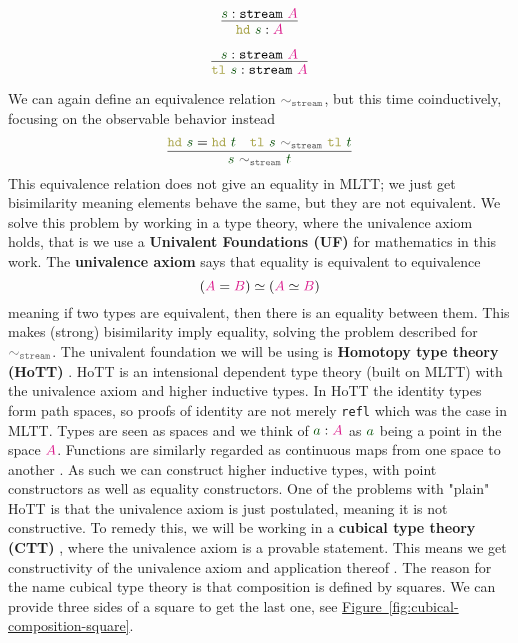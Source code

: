 \documentclass[twoside,11pt,openright]{report}
\theoremstyle{plain} %
\theoremstyle{definition}
\theoremstyle{remark}
\newcommand*{\figref}[1]{\hyperref[fig:#1]{Figure~\ref*{fig:#1}}}
\newcommand*{\term}[1]{\textcolor{green!30!black}{#1}} %
\newcommand*{\type}[1]{\textcolor{magenta!90!black}{#1}}
\newcommand*{\relation}[1]{\textcolor{gray!75!black}{\ensuremath{\mathtt{#1}}}}
\newcommand*{\destructor}[1]{\textcolor{yellow!60!black}{\ensuremath{\mathtt{#1}}}}
\newcommand*{\typeformer}[1]{\ensuremath{\mathtt{#1}}}
\begin{document}
\begin{center}
  \strut
  \hfill
  \begin{minipage}{0.225\linewidth}
    \begin{equation}
      \vcenter{\infer{\destructor{hd}~\term{s} : \type{A}}{\term{s} : \typeformer{stream}~\type{A}}}
    \end{equation}
  \end{minipage}
  \hfill
  \begin{minipage}{0.25\linewidth}
    \begin{equation}
      \vcenter{\infer{\destructor{tl}~\term{s}: \typeformer{stream}~\type{A}}{\term{s} : \typeformer{stream}~\type{A}}}
    \end{equation}
  \end{minipage}
  \hfill
  \strut
\end{center}
We can again define an equivalence relation \(\relation{\sim_{stream}}\), but this time coinductively, focusing on the observable behavior instead
\begin{equation}
  \label{eq:stream-bisimilarity}
  \vcenter{\infer{\term{s}~\relation{\sim_{stream}}~\term{t}}{\destructor{hd}~\term{s} = \destructor{hd}~\term{t} & \destructor{tl}~\term{s}~\relation{\sim_{stream}}~\destructor{tl}~\term{t}}}
\end{equation}
This equivalence relation does not give an equality in MLTT; we just get bisimilarity meaning elements behave the same, but they are not equivalent. We solve this problem by working in a type theory, where the univalence axiom holds, that is we use a \textbf{Univalent Foundations (UF)} for mathematics in this work. The \textbf{univalence axiom} says that equality is equivalent to equivalence
\begin{equation}
  (\type{A} = \type{B}) \simeq (\type{A} \simeq \type{B})
\end{equation}
meaning if two types are equivalent, then there is an equality between them. This makes (strong) bisimilarity imply equality, solving the problem described for \(\relation{\sim_{stream}}\). The univalent foundation we will be using is \textbf{Homotopy type theory (HoTT)} \cite{hottbook}. HoTT is an intensional dependent type theory (built on MLTT) with the univalence axiom and higher inductive types. In HoTT the identity types form path spaces, so proofs of identity are not merely \texttt{refl} which was the case in MLTT. Types are seen as spaces and we think of \(\term{a} : \type{A}\) as \(\term{a}\) being a point in the space \(\type{A}\). Functions are similarly regarded as continuous maps from one space to another \cite{nlab:homotopy_type_theory}. As such we can construct higher inductive types, with point constructors as well as equality constructors. One of the problems with "plain" HoTT is that the univalence axiom is just postulated, meaning it is not constructive. To remedy this, we will be working in a \textbf{cubical type theory (CTT)} \cite{DBLP:CTT}, where the univalence axiom is a provable statement. This means we get constructivity of the univalence axiom and application thereof \cite{nlab:cubical_type_theory}.  The reason for the name cubical type theory is that composition is defined by squares. We can provide three sides of a square to get the last one, see \figref{cubical-composition-square}.
\end{document}
